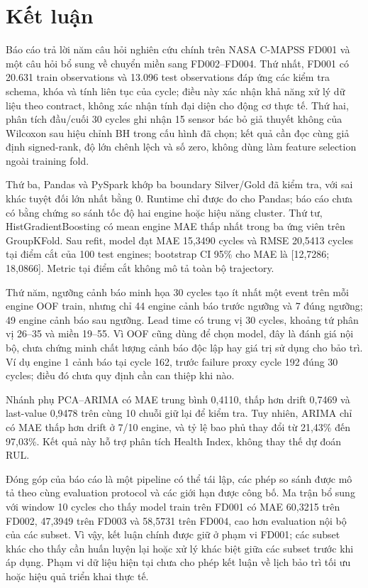 \section{Kết luận}

Báo cáo trả lời năm câu hỏi nghiên cứu chính trên NASA C-MAPSS FD001 và một câu
hỏi bổ sung về chuyển miền sang FD002--FD004.
Thứ nhất, FD001 có 20.631 train observations và 13.096 test observations đáp ứng các
kiểm tra schema, khóa và tính liên tục của cycle; điều này xác nhận khả năng
xử lý dữ liệu theo contract, không xác nhận tính đại diện cho động cơ thực tế.
Thứ hai, phân tích đầu/cuối 30 cycles ghi nhận 15 sensor bác bỏ giả thuyết
không của Wilcoxon sau hiệu chỉnh BH trong cấu hình đã chọn; kết quả cần đọc
cùng giả định signed-rank, độ lớn chênh lệch và số zero, không dùng làm
feature selection ngoài training fold.

Thứ ba, Pandas và PySpark khớp ba boundary Silver/Gold đã kiểm tra, với sai
khác tuyệt đối lớn nhất bằng 0. Runtime chỉ được đo cho Pandas; báo cáo chưa
có bằng chứng so sánh tốc độ hai engine hoặc hiệu năng cluster. Thứ tư,
HistGradientBoosting có mean engine MAE thấp nhất trong ba ứng viên trên
GroupKFold. Sau refit, model đạt MAE 15,3490 cycles và RMSE 20,5413 cycles tại
điểm cắt của 100 test engines; bootstrap CI 95\% cho MAE là
[12,7286; 18,0866]. Metric tại điểm cắt không mô tả toàn bộ trajectory.

Thứ năm, ngưỡng cảnh báo minh họa 30 cycles tạo ít nhất một event trên mỗi
engine OOF train, nhưng chỉ 44 engine cảnh báo trước ngưỡng và 7 đúng ngưỡng;
49 engine cảnh báo sau ngưỡng. Lead time có trung vị 30 cycles, khoảng tứ
phân vị 26--35 và miền 19--55. Vì OOF cũng dùng để chọn model, đây là đánh giá
nội bộ, chưa chứng minh chất lượng cảnh báo độc lập hay giá trị sử dụng cho bảo trì.
Ví dụ engine 1 cảnh báo tại cycle 162, trước failure proxy cycle 192 đúng
30 cycles; điều đó chưa quy định cần can thiệp khi nào.

Nhánh phụ PCA--ARIMA có MAE trung bình 0,4110, thấp hơn drift 0,7469 và
last-value 0,9478 trên cùng 10 chuỗi giữ lại để kiểm tra. Tuy nhiên, ARIMA chỉ có
MAE thấp hơn drift ở 7/10 engine, và tỷ lệ bao phủ thay đổi từ 21,43\% đến 97,03\%.
Kết quả này hỗ trợ phân tích Health Index, không thay thế dự đoán RUL.

Đóng góp của báo cáo là một pipeline có thể tái lập, các phép so sánh được mô tả
theo cùng evaluation protocol và các giới hạn được công bố. Ma trận bổ sung với
window 10 cycles cho thấy model train trên FD001 có MAE 60,3215 trên FD002,
47,3949 trên FD003 và 58,5731 trên FD004, cao hơn evaluation nội bộ của các
subset. Vì vậy, kết luận chính được giữ ở phạm vi FD001; các subset khác cho
thấy cần huấn luyện lại hoặc xử lý khác biệt giữa các subset trước khi áp dụng.
Phạm vi dữ liệu hiện tại chưa cho phép kết luận về lịch bảo trì tối ưu hoặc hiệu
quả triển khai thực tế.

